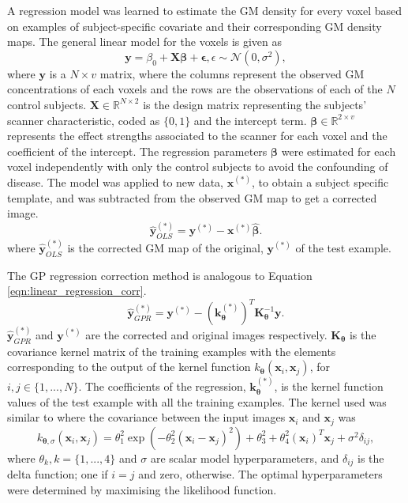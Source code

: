 A regression model was learned to estimate the GM density for every voxel based on examples of subject-specific covariate and their corresponding GM density maps. The general linear model for the voxels is given as
\begin{equation}
\mathbf{y} = \beta_0 + \mathbf{X}\mathbf{\beta} + \mathbf{\epsilon}, \epsilon\sim\mathcal{N}(0,\sigma^2),
\end{equation}
where $\mathbf{y}$ is a $N\times v$ matrix, where the columns represent the observed GM concentrations of each voxels and the rows are the observations of each of the $N$ control subjects. $\mathbf{X} \in \mathbb{R}^{N\times2}$ is the design matrix representing the subjects' scanner characteristic, coded as $\{0,1\}$ and the intercept term. $\mathbf{\beta}\in\mathbb{R}^{2\times v}$ represents the effect strengths associated to the scanner for each voxel and the coefficient of the intercept. The regression parameters $\mathbf{\beta}$ were estimated for each voxel independently with only the control subjects to avoid the confounding of disease. The model was applied to new data, $\mathbf{x}^{(*)}$, to obtain a subject specific template, and was subtracted from the observed GM map to get a corrected image.
\begin{equation}
\label{eqn:linear_regression_corr}
\hat{\mathbf{y}}_{OLS}^{(*)} = \mathbf{y}^{(*)} - \mathbf{x}^{(*)}\hat{\mathbf{\beta}}.
\end{equation}
where $\hat{\mathbf{y}}_{OLS}^{(*)}$ is the corrected GM map of the original, $\mathbf{y}^{(*)}$ of the test example.

The GP regression correction method is analogous to Equation \ref{eqn:linear_regression_corr}.
\begin{equation}
\label{eqn:gp_regression_corr}
\hat{\mathbf{y}}_{GPR}^{(*)} = \mathbf{y}^{(*)} - (\mathbf{k}_{\mathbf{\theta}}^{(*)})^T\mathbf{K}^{-1}_\mathbf{\theta}\mathbf{y}.
\end{equation}
$\hat{\mathbf{y}}_{GPR}^{(*)}$ and  $\mathbf{y}^{(*)}$ are the corrected and original images respectively. $\mathbf{K}_\mathbf{\theta}$ is the covariance kernel matrix of the training examples with the elements corresponding to the output of the kernel function $k_\mathbf{\theta}(\mathbf{x}_i,\mathbf{x}_j)$, for $i,j \in \{1,...,N\}$. The coefficients of the regression, $\mathbf{k}_{\mathbf{\theta}}^{(*)}$, is the kernel function values of the test example with all the training examples. The kernel used was similar to \cite{kostro2014correction} where the covariance between the input images $\mathbf{x}_i$ and $\mathbf{x}_j$ was
\begin{equation}
	k_{\mathbf{\theta},\sigma}(\mathbf{x}_i,\mathbf{x}_j) = \theta_1^2 \exp(-\theta_2^2(\mathbf{x}_i -\mathbf{x}_j)^2) + \theta_3^2 + \theta_4^2(\mathbf{x}_i)^T\mathbf{x}_j + \sigma^2\delta_{ij},
\end{equation}
where $\theta_k,k=\{1,...,4\}$ and $\sigma$ are scalar model hyperparameters, and $\delta_{ij}$ is the delta function; one if $i=j$ and zero, otherwise. The optimal hyperparameters were determined by maximising the likelihood function.
